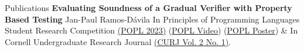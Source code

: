 
\begin{rSection}{Publications}
	\textbf{Evaluating Soundness of a Gradual Verifier with Property Based Testing} \small{Jan-Paul Ramos-D{\'a}vila In \small{Principles of Programming Languages Student Research Competition \href{https://popl23.sigplan.org/details/POPL-2023-student-research-competition/13/Evaluating-Soundness-of-a-Gradual-Verifier-with-Property-Based-Testing}{(POPL 2023\ExternalLink)} (\href{https://www.youtube.com/watch?v=sIIwmw0z2Yg}{POPL Video\ExternalLink }) (\href{https://jpramos.me/data/pdf/POPL%2023%20SRC%20POSTER.pdf}{POPL Poster\ExternalLink}) \& In Cornell Undergraduate Research Journal \href{https://journals.library.cornell.edu/index.php/CURJ/article/view/696}{(CURJ Vol. 2 No. 1\ExternalLink)}}}.
\end{rSection}